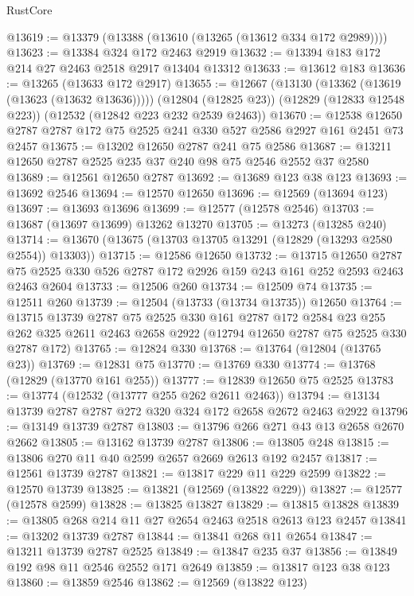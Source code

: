 \begin{lexlean}{RustCore}
\begin{coremodule}
@13619 := @13379 (@13388 (@13610 (@13265 (@13612 @334 @172 @2989))))
@13623 := @13384 @324 @172 @2463 @2919
@13632 := @13394 @183 @172 @214 @27 @2463 @2518 @2917 @13404 @13312
@13633 := @13612 @183
@13636 := @13265 (@13633 @172 @2917)
@13655 := @12667
    (@13130 (@13362 (@13619 (@13623 (@13632 @13636)))))
    (@12804 (@12825 @23))
    (@12829 (@12833 @12548 @223))
    (@12532 (@12842 @223 @232 @2539 @2463))
@13670 := @12538 @12650 @2787 @2787 @172 @75 @2525 @241 @330 @527 @2586 @2927 @161 @2451 @73 @2457
@13675 := @13202 @12650 @2787 @241 @75 @2586
@13687 := @13211 @12650 @2787 @2525 @235 @37 @240 @98 @75 @2546 @2552 @37 @2580
@13689 := @12561 @12650 @2787
@13692 := @13689 @123 @38 @123
@13693 := @13692 @2546
@13694 := @12570 @12650
@13696 := @12569 (@13694 @123)
@13697 := @13693 @13696
@13699 := @12577 (@12578 @2546)
@13703 := @13687 (@13697 @13699) @13262 @13270
@13705 := @13273 (@13285 @240)
@13714 := @13670 (@13675 (@13703 @13705 @13291 (@12829 (@13293 @2580 @2554)) @13303))
@13715 := @12586 @12650
@13732 := @13715
    @12650
    @2787
    @75
    @2525
    @330
    @526
    @2787
    @172
    @2926
    @159
    @243
    @161
    @252
    @2593
    @2463
    @2463
    @2604
@13733 := @12506 @260
@13734 := @12509 @74
@13735 := @12511 @260
@13739 := @12504 (@13733 (@13734 @13735)) @12650
@13764 := @13715
    @13739
    @2787
    @75
    @2525
    @330
    @161
    @2787
    @172
    @2584
    @23
    @255
    @262
    @325
    @2611
    @2463
    @2658
    @2922
    (@12794 @12650 @2787 @75 @2525 @330 @2787 @172)
@13765 := @12824 @330
@13768 := @13764 (@12804 (@13765 @23))
@13769 := @12831 @75
@13770 := @13769 @330
@13774 := @13768 (@12829 (@13770 @161 @255))
@13777 := @12839 @12650 @75 @2525
@13783 := @13774 (@12532 (@13777 @255 @262 @2611 @2463))
@13794 := @13134 @13739 @2787 @2787 @272 @320 @324 @172 @2658 @2672 @2463 @2922
@13796 := @13149 @13739 @2787
@13803 := @13796 @266 @271 @43 @13 @2658 @2670 @2662
@13805 := @13162 @13739 @2787
@13806 := @13805 @248
@13815 := @13806 @270 @11 @40 @2599 @2657 @2669 @2613 @192 @2457
@13817 := @12561 @13739 @2787
@13821 := @13817 @229 @11 @229 @2599
@13822 := @12570 @13739
@13825 := @13821 (@12569 (@13822 @229))
@13827 := @12577 (@12578 @2599)
@13828 := @13825 @13827
@13829 := @13815 @13828
@13839 := @13805 @268 @214 @11 @27 @2654 @2463 @2518 @2613 @123 @2457
@13841 := @13202 @13739 @2787
@13844 := @13841 @268 @11 @2654
@13847 := @13211 @13739 @2787 @2525
@13849 := @13847 @235 @37
@13856 := @13849 @192 @98 @11 @2546 @2552 @171 @2649
@13859 := @13817 @123 @38 @123
@13860 := @13859 @2546
@13862 := @12569 (@13822 @123)

\end{coremodule}
\end{lexlean}
